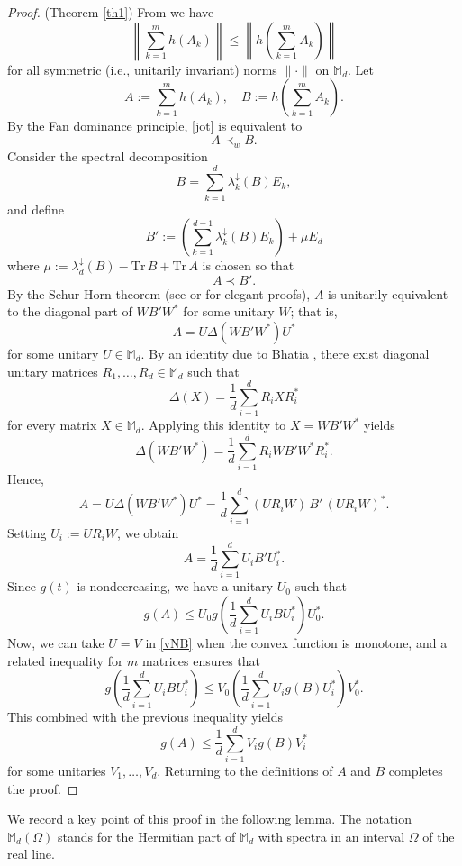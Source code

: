 \documentclass[12pt,reqno]{article}
\theoremstyle{definition}
\theoremstyle{remark}
\numberwithin{equation}{section}
\def\bM{\mathbb{M}}
\begin{document}
\vskip 5pt\noindent
\begin{proof} (Theorem \ref{th1}) From \cite[Corollary 3.2]{BLjot} we have
\begin{equation}\label{jot}
\left\|  \sum_{k=1}^m h(A_k) \right\|\le \left\|  h\left(\sum_{k=1}^m A_k\right) \right\| 
\end{equation}
for all symmetric (i.e., unitarily invariant) norms $\|\cdot\|$ on $\bM_d$. Let 
\begin{equation*}
A:=\sum_{k=1}^m h(A_k), \quad B:= h\left(\sum_{k=1}^m A_k\right).
\end{equation*} 
By the Fan dominance principle, \eqref{jot} is equivalent to   $$A\prec_{w}B.$$
Consider the spectral decomposition
$$
B=\sum_{k=1}^d\lambda_k^{\downarrow}(B)E_k,
$$
and define
$$
B':= \left(\sum_{k=1}^{d-1}\lambda_k^{\downarrow}(B)E_k\right) + \mu E_d
$$
where $\mu:= \lambda_d^{\downarrow}(B)-{\mathrm{Tr\,}} B +{\mathrm{Tr\,}} A $  is chosen so that
$$
A\prec B'.
$$
By the Schur-Horn theorem
(see \cite{M} or \cite{Chan} for  elegant proofs), $A$ is unitarily equivalent to the diagonal part 
 of $WB'W^*$ for some unitary $W$; that is,
\begin{equation}\label{SH}
A=U\Delta(WB'W^*)U^*
\end{equation}
for some unitary $U\in\bM_d$.
By an identity due to Bhatia \cite[Eq.\ (2)]{Bh-monthly}, there exist diagonal
unitary matrices $R_1,\ldots,R_d\in\bM_d$ such that
\[
\Delta(X)=\frac{1}{d}\sum_{i=1}^d R_iXR_i^*
\]
for every matrix $X\in\bM_d$. Applying this identity to
$X=WB'W^*$ yields
\[
\Delta(WB'W^*)
=
\frac{1}{d}\sum_{i=1}^d
R_iWB'W^*R_i^*.
\]
Hence,
\[
A
=
U\Delta(WB'W^*)U^*
=
\frac{1}{d}\sum_{i=1}^d
(UR_iW)\,B'\,(UR_iW)^*.
\]
Setting $U_i:=UR_iW$, we obtain
\[
A=\frac{1}{d}\sum_{i=1}^d U_iB'U_i^*.
\]
Since $g(t)$ is nondecreasing, we have a unitary $U_0$ such that
$$
g(A)\le U_0g\left(\frac{1}{d}\sum_{i=1}^d U_i BU_i^*\right)U_0^*.
$$
Now, we can take $U=V$ in \eqref{vNB} when the convex function is  monotone, and  a related inequality for $m$ matrices \cite[Corollary 2.4]{BL} ensures that
$$
g\left(\frac{1}{d}\sum_{i=1}^d U_i BU_i^*\right) \le V_0 \left(\frac{1}{d}\sum_{i=1}^d U_i g(B)U_i^*\right)V_0^*.
$$
This combined with the previous inequality yields
$$
g(A) \le \frac{1}{d}\sum_{i=1}^d V_i g(B)V_i^*
$$
for some unitaries $V_1,\ldots, V_d$. Returning to  the definitions of $A$ and $B$ completes the proof. 
\end{proof}

\vskip 5pt
We record a key point of this proof in the following lemma. The notation $\bM_d(\Omega)$
stands for the Hermitian part of $\bM_d$ with spectra in an interval $\Omega$ of the real line.
\end{document}
